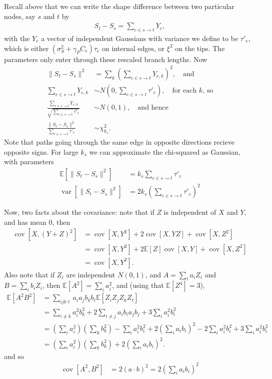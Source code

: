 \documentclass{article}
\newcommand{\E}{\mathbb{E}}
\DeclareMathOperator{\cov}{cov}
\DeclareMathOperator{\var}{var}
\begin{document}
Recall above that we can write the shape difference between two particular nodes, 
say $s$ and $t$ by
\begin{align*}
    S_t - S_s = \sum_{e \in s \to t} Y_e ,
\end{align*}
with the $Y_e$ a vector of independent Gaussians with variance we define to be $\tau'_e$, 
which is either $(\sigma^2_S + \gamma_P C_e) \tau_e$ on internal edges, or $\xi^2$ on the tips.
The parameters only enter through these rescaled branch lengths.
Now 
\begin{align}
  \|S_t - S_s\|^2 &= \sum_k \left( \sum_{e \in s \to t} Y_{e,k} \right)^2 , \quad \text{and} \\
  \sum_{e \in s \to t} Y_{e,k} & \sim N(0, \sum_{e \in s \to t} \tau'_e ), \quad \text{for each $k$, so} \\
  \frac{ \sum_{e \in s \to t} Y_{e,k} }{ \sqrt{ \sum_{e \in s \to t} \tau'_e } } &\sim N(0,1), \quad \text{and hence} \\
  \frac{ \|S_t - S_s\|^2 }{  \sum_{e \in s \to t} \tau'_e } &\sim \chi^2_{k_s} .
\end{align}
Note that paths going through the same edge in opposite directions recieve opposite signs.
For large $k_s$ we can approximate the chi-squared as Gaussian,
with parameters
\begin{align*}
    \E[ \|S_t - S_s\|^2 ] &= k_s \sum_{e \in s \to t} \tau'_e \\
    \var[ \|S_t - S_s\|^2 ] &= 2 k_s \left( \sum_{e \in s \to t} \tau'_e \right)^2 
\end{align*}

Now, two facts about the covariance: note that if $Z$ is independent of $X$ and $Y$, and has mean 0, then
\begin{align}
    \cov[X,(Y+Z)^2] &= \cov[X,Y^2] + 2 \cov[X,YZ] + \cov[X, Z^2] \\
    &= \cov[X,Y^2] + 2 \E[Z] \cov[X,Y] + \cov[X,Z^2] \\
    &= \cov[X,Y^2] .
\end{align}
Also note that if $Z_i$ are independent $N(0,1)$, and $A=\sum_i a_i Z_i$ and $B=\sum_i b_i Z_i$,
then $\E[A^2] = \sum_i a_i^2$, and (using that $\E[Z^4] = 3$),
\begin{align}
  \E[A^2 B^2] &= \sum_{ijk\ell} a_i a_j b_k b_\ell \E[Z_i Z_j Z_k Z_\ell] \\
  &= \sum_{i \neq k} a_i^2 b_k^2   %
  + 2 \sum_{i \neq j} a_i b_i a_j b_j   %
  + 3 \sum_i a_i^2 b_i ^2  \\  %
  &= (\sum_i a_i^2)(\sum_k b_k^2) - \sum_i a_i^2 b_i^2 
  + 2 \left( \sum_i a_i b_i \right)^2 - 2 \sum_i a_i^2 b_i^2 
  + 3 \sum_i a_i^2 b_i^2 \\
  &= (\sum_i a_i^2)(\sum_k b_k^2) 
  + 2 \left( \sum_i a_i b_i \right)^2 .
\end{align}
and so
\begin{align}
  \cov[ A^2, B^2 ] &= 2( a \cdot b )^2 = 2( \sum_i a_i b_i )^2 
\end{align}
\end{document}
